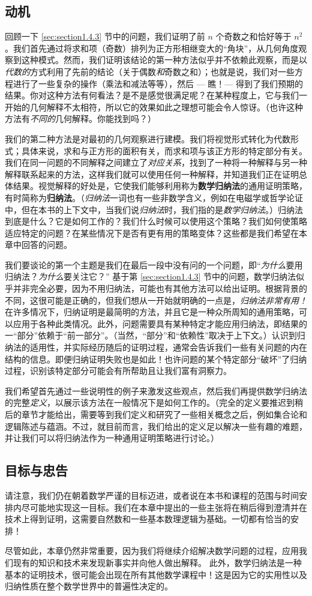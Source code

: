 \subsection{动机}

回顾一下 \ref{sec:section1.4.3} 节中的问题，我们证明了前 $n$ 个奇数之和恰好等于 $n^2$。我们首先通过将求和项（奇数）排列为正方形相继变大的“角块”，从几何角度观察到这种模式。然而，我们证明该结论的第一种方法似乎并不依赖此观察，而是以\textit{代数的}方式利用了先前的结论（关于偶数\textit{和}奇数之和）；也就是说，我们对一些方程进行了一些复杂的操作（乘法和减法等等），然后 --- 瞧！--- 得到了我们预期的结果。你对这种方法有何看法？是不是感觉很满足呢？在某种程度上，它与我们一开始的几何解释不太相符，所以它的效果如此之理想可能会令人惊讶。（也许这种方法有\textit{不同的}几何解释。你能找到吗？）

我们的第二种方法是对最初的几何观察进行建模。我们将视觉形式转化为代数形式；具体来说，求和与正方形的面积有关，而求和项与该正方形的特定部分有关。我们在同一问题的不同解释之间建立了\textit{对应关系}，找到了一种将一种解释与另一种解释联系起来的方法，这样我们就可以使用任何一种解释，并知道我们正在证明总体结果。视觉解释的好处是，它使我们能够利用称为\textbf{数学归纳法}的通用证明策略，有时简称为\textbf{归纳法}。（\textit{归纳法}一词也有一些非数学含义，例如在电磁学或哲学论证中，但在本书的上下文中，当我们说\textit{归纳法}时，我们指的是\textit{数学归纳法}。）归纳法到底是什么？它是如何工作的？我们什么时候可以使用这个策略？我们如何使策略适应特定的问题？在某些情况下是否有更有用的策略变体？这些都是我们希望在本章中回答的问题。

我们要谈论的第一个主题是我们在最后一段中没有问的一个问题，即“\textit{为什么}要用归纳法？\textit{为什么}要关注它？” 基于第 \ref{sec:section1.4.3} 节中的问题，数学归纳法似乎并非完全必要，因为不用归纳法，可能也有其他方法可以给出证明。根据背景的不同，这很可能是正确的，但我们想从一开始就明确的一点是，\textit{归纳法非常有用！}在许多情况下，归纳证明是最简明的方法，并且它是一种众所周知的通用策略，可以应用于各种此类情况。此外，问题需要具有某种特定才能应用归纳法，即结果的一“部分”依赖于“前一部分”。（当然，“部分”和“依赖性”取决于上下文。）认识到归纳法的适用性，并实际经历随后的证明过程，通常会告诉我们一些有关问题的内在结构的信息。即便归纳证明失败也是如此！也许问题的某个特定部分“破坏”了归纳过程，识别该特定部分可能会有所帮助且让我们富有洞察力。

我们希望首先通过一些说明性的例子来激发这些观点，然后我们再提供数学归纳法的完整\textit{定义}，以展示该方法在一般情况下是如何工作的。（完全的定义要推迟到稍后的章节才能给出，需要等到我们定义和研究了一些相关概念之后，例如集合论和逻辑陈述与蕴涵。不过，就目前而言，我们给出的定义足以解决一些有趣的难题，并让我们可以将归纳法作为一种通用证明策略进行讨论。）

\subsection{目标与忠告}

请注意，我们仍在朝着数学严谨的目标迈进，或者说在本书和课程的范围与时间安排内尽可能地实现这一目标。我们在本章中提出的一些主张将在稍后得到澄清并在技术上得到证明，这需要自然数和一些基本数理逻辑为基础。一切都有恰当的安排！

尽管如此，本章仍然非常重要，因为我们将继续介绍解决数学问题的过程，应用我们现有的知识和技术来发现新事实并向他人做出解释。 此外，数学归纳法是一种基本的证明技术，很可能会出现在所有其他数学课程中！这是因为它的实用性以及归纳性质在整个数学世界中的普遍性决定的。